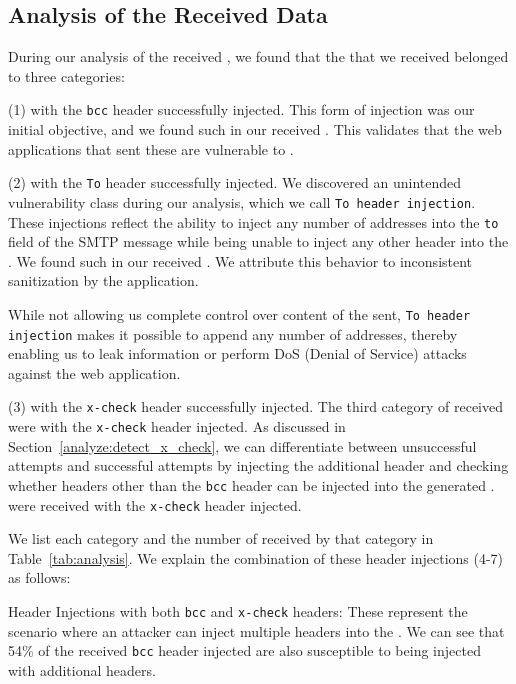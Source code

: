 
\subsection{Analysis of the Received \Email Data}

During our analysis of the received \emails, we found that the \emails that we received belonged to three categories:

(1) \Emails with the \lstinline{bcc} header successfully injected. This form
of injection was our initial objective, and we found
\ehibcc such \emails in our received \emails. This validates that the
web applications that sent these \emails are vulnerable to \ehi.

(2) \Emails with the \lstinline{To} header successfully injected. We
discovered an unintended vulnerability class during our analysis,
which we call \lstinline{To header injection}. These injections reflect
the ability to inject any number of \email addresses into the
\lstinline{to} field of the SMTP message while being unable to inject any
other header into the \emails. We found \ehito such \emails in our
received \emails. We attribute this behavior to inconsistent
sanitization by the application.
   
While not allowing us complete control over content of the \emails
sent, \lstinline{To header injection} makes it possible to append any
number of \email addresses, thereby enabling us to leak information or
perform DoS (Denial of Service) attacks against the web application.
	
(3) \Emails with the \lstinline{x-check} header successfully injected. The
third category of \emails received were \emails with the
\lstinline{x-check} header injected. As discussed in
Section~\ref{analyze:detect_x_check}, we can differentiate between
unsuccessful attempts and successful attempts by injecting the
additional header and checking whether headers other than the
\lstinline{bcc} header can be injected into the generated \email.
\ehixcheck \emails were received with the \lstinline{x-check} header
injected.

We list each category and the number of \emails received by that
category in Table~\ref{tab:analysis}. We explain the combination of
these header injections (4-7) as follows:



\Email Header Injections with both \lstinline{bcc} and \lstinline{x-check}
headers: These represent the scenario where an attacker can inject
multiple headers into the \emails. We can see that 54\% of the
received \lstinline{bcc} header injected \emails are also susceptible to
being injected with additional headers.
	
